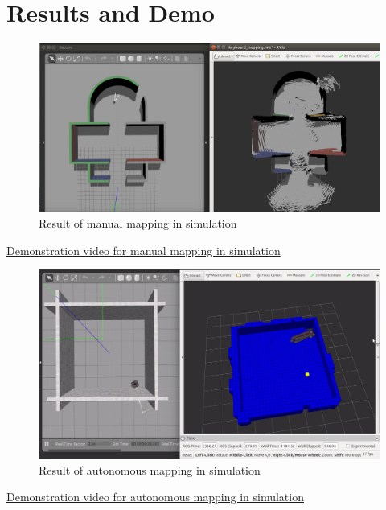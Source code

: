 \documentclass[a4paper,12pt,oneside]{book}
\begin{document}

\section{Results and Demo}
\begin{figure}[h]
	\centering
	\includegraphics[scale=0.26]{map}
	\caption{Result of manual mapping in simulation}
\end{figure}

\href{https://youtu.be/cg0Gf3kulE8}{Demonstration video for manual mapping in simulation}

\pagebreak

\begin{figure}[h]
	\centering
	\includegraphics[scale=0.35]{automap}
	\caption{Result of autonomous mapping in simulation}
\end{figure}

\href{https://youtu.be/kXyV3OpbWo8}{Demonstration video for autonomous mapping in simulation}
\end{document}
